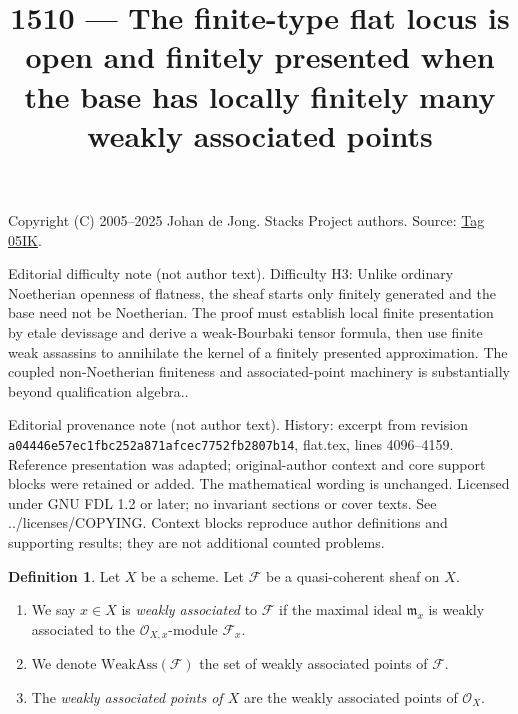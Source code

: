 \documentclass{amsart}
\theoremstyle{plain}
\theoremstyle{definition}
\newtheorem{definition}[subsection]{Definition}
\theoremstyle{remark}
\numberwithin{equation}{subsection}
\begin{document}
\title[Stacks Project, Tag 05IK]{1510 --- The finite-type flat locus is open and finitely presented when the base has locally finitely many weakly associated points}
\maketitle
\noindent Copyright (C) 2005--2025 Johan de Jong. Stacks Project authors. Source: \href{https://stacks.math.columbia.edu/tag/05IK}{Tag 05IK}.

\noindent Editorial difficulty note (not author text). Difficulty H3: Unlike ordinary Noetherian openness of flatness, the sheaf starts only finitely generated and the base need not be Noetherian. The proof must establish local finite presentation by etale devissage and derive a weak-Bourbaki tensor formula, then use finite weak assassins to annihilate the kernel of a finitely presented approximation. The coupled non-Noetherian finiteness and associated-point machinery is substantially beyond qualification algebra..

\noindent Editorial provenance note (not author text). History: excerpt from revision \texttt{a0444\allowbreak 6e57e\allowbreak c1fbc\allowbreak 252a8\allowbreak 71afc\allowbreak ec775\allowbreak 2fb28\allowbreak 07b14}, flat.tex, lines 4096--4159. Reference presentation was adapted; original-author context and core support blocks were retained or added. The mathematical wording is unchanged. Licensed under GNU FDL 1.2 or later; no invariant sections or cover texts. See ../licenses/COPYING. Context blocks reproduce author definitions and supporting results; they are not additional counted problems.

\begin{definition}
\label{divisors-definition-weakly-associated}
Let $X$ be a scheme.
Let $\mathcal{F}$ be a quasi-coherent sheaf on $X$.
\begin{enumerate}
\item We say $x \in X$ is {\it weakly associated} to $\mathcal{F}$
if the maximal ideal $\mathfrak m_x$ is weakly associated to the
$\mathcal{O}_{X, x}$-module $\mathcal{F}_x$.
\item We denote $\text{WeakAss}(\mathcal{F})$ the set of weakly associated
points of $\mathcal{F}$.
\item The {\it weakly associated points of $X$} are the weakly associated
points of $\mathcal{O}_X$.
\end{enumerate}
\end{definition}
\end{document}
